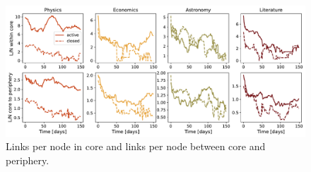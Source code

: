 
\begin{figure}[h]
	\centering
	\includegraphics[width=\linewidth]{figures/stackexchange/core_connectivity.pdf}
	\caption{Links per node in core and links per node between core and periphery.}
	\label{fig:links_per_node}
\end{figure}

